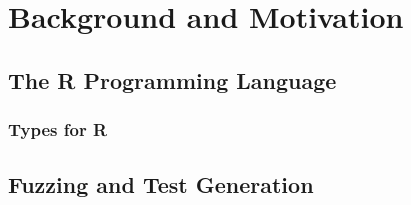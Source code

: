 \section{Background and Motivation}

\subsection{The R Programming Language}

\subsubsection{Types for R}

\subsection{Fuzzing and Test Generation}